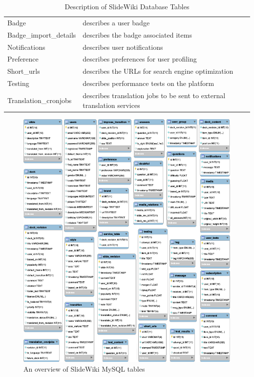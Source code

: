 \documentclass[ngerman,UKenglish,table]{scrbook}
\begin{document}
\begin{table}[!ht]
\begin{tabulary}{1\columnwidth}{ll}
Badge & describes a user badge\\
Badge\_import\_details & describes the badge associated items\\
Notifications & describes user notifications\\
Preference & describes preferences for user profiling\\
Short\_urls & describes the URLs for search engine optimization\\
Testing & describes performance tests on the platform\\
Translation\_cronjobs & describes translation jobs to be sent to external translation services \\

\bottomrule


\end{tabulary}
\caption{Description of SlideWiki Database Tables}
\label{tab:mysql_tables}
\end{table}





\begin{figure}[!htb]
	\centering
		\includegraphics[width=\columnwidth]{images/erm_OLD2.png}
		\caption{An overview of SlideWiki MySQL tables}
	\label{fig:mysql_tables}
\end{figure}
\end{document}
